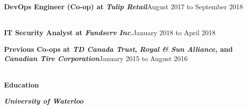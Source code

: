 \documentclass[9pt]{extarticle}
\begin{document}
{    \textbf{{\firamedium DevOps Engineer (Co-op) at \textit{Tulip Retail}}}{\color{darkgrey}\hfill{\small{August 2017 to September 2018\\[5pt]}}
        \\[-10pt]
    }

    \textbf{{\firamedium IT Security Analyst at \textit{Fundserv Inc.}}}{\color{darkgrey}\hfill{\small{January 2018 to April 2018\\[-20pt]}}
    }

    \textbf{{\firamedium Previous Co-ops at \textit{TD Canada Trust}, \textit{Royal \& Sun Alliance}, and \textit{Canadian Tire Corporation}}}{\color{darkgrey}\hfill{\small{January 2015 to August 2016 \\[-10pt]}}
    }
    {\color{lightgrey}{\centerline{\rule{17cm}{0.4pt}}}}
    \begin{LARGE}
        \color{em-light}\textbf{\\[-5pt]{\firamedium Education}\\[-15pt]}
    \end{LARGE}

    \textit{\textbf{{\firamedium University of Waterloo}}}{}
}
\end{document}
